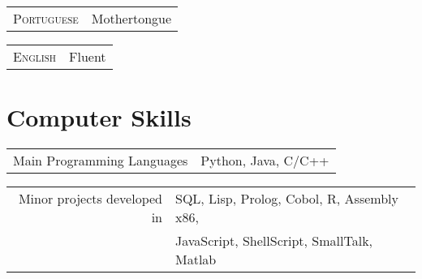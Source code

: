 \documentclass[a4paper,10pt]{article}
\begin{document}
\begin{tabularx}{\textwidth}{D|R}
\textsc{Portuguese} & Mothertongue\\
\end{tabularx}

\begin{tabularx}{\textwidth}{D|R}
\textsc{English}    & Fluent\\
\end{tabularx}


\section{Computer Skills}


\begin{tabularx}{\textwidth}{D|S}
Main Programming Languages  & Python, Java, C/C++\\
\end{tabularx}

\begin{tabularx}{\textwidth}{D|S}
Minor projects developed in & SQL, Lisp, Prolog, Cobol, R, Assembly x86,\\
                            & JavaScript, ShellScript, SmallTalk, Matlab\\
\end{tabularx}
\end{document}
